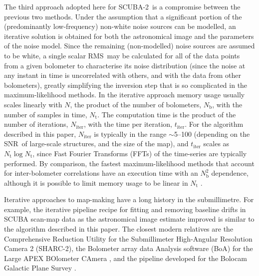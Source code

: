 \documentclass[useAMS,usenatbib,nofootinbib]{mn2e}
\newcommand{\snr}{SNR}
\newcommand{\scuba}{SCUBA-2}
\newcommand{\rms}{RMS}
\begin{document}
The third approach adopted here for \scuba\ is a compromise between
the previous two methods. Under the assumption that a significant
portion of the (predominantly low-frequency) non-white noise sources
can be modelled, an iterative solution is obtained for both the
astronomical image and the parameters of the noise model. Since the
remaining (non-modelled) noise sources are assumed to be white, a
single scalar \rms\ may be calculated for all of the data points from
a given bolometer to characterise its noise distribution (since the
noise at any instant in time is uncorrelated with others, and with the
data from other bolometers), greatly simplifying the inversion step
that is so complicated in the maximum-likelihood methods. In the
iterative approach memory usage usually scales linearly with $N$, the
product of the number of bolometers, $N_\mathrm{b}$, with the number
of samples in time, $N_\mathrm{t}$. The computation time is the
product of the number of iterations, $N_\mathrm{iter}$, with the time
per iteration, $t_\mathrm{iter}$. For the algorithm described in this
paper, $N_\mathrm{iter}$ is typically in the range $\sim$5--100
(depending on the \snr\ of large-scale structures, and the size of the
map), and $t_\mathrm{iter}$ scales as $N_\mathrm{t} \log
N_\mathrm{t}$, since Fast Fourier Transforms (FFTs) of the time-series
are typically performed. By comparison, the fastest maximum-likelihood
methods that account for inter-bolometer correlations have an
execution time with an $N_\mathrm{b}^2$ dependence, although it is
possible to limit memory usage to be linear in $N_\mathrm{t}$
\citep[e.g.,][]{patanchon2008}.

Iterative approaches to map-making have a long history in the submillimetre. For example, the iterative pipeline recipe for fitting and
removing baseline drifts in SCUBA scan-map data as the astronomical
image estimate improved \citep{1999ASPC..172..171J} is similar to the
algorithm described in this paper. The closest modern relatives are
the Comprehensive Reduction Utility \citep[CRUSH,][]{kovacs2008} for
the Submillimeter High-Angular Resolution Camera 2 (SHARC-2), the
Bolometer array data Analysis software (BoA) for the Large APEX
BOlometer CAmera \citep[LABOCA,][]{siringo2009}, and the pipeline
developed for the Bolocam Galactic Plane Survey \citep{aguirre2011}.
\end{document}

